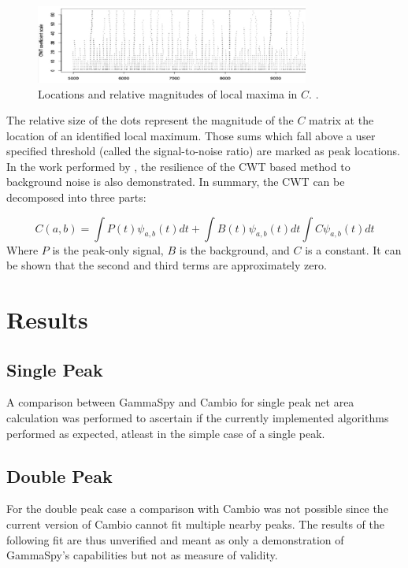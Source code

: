 \documentclass[10pt]{article}
\begin{document}
\begin{figure}[!htbp]
\centering
\includegraphics[width=9cm]{images/cwt_dots.png}
\caption{Locations and relative magnitudes of local maxima in $C$. \cite{Du:2006}.}
\label{cwt_dots}
\end{figure}
The relative size of the dots represent the magnitude of the $C$ matrix at the location of an identified local maximum.
Those sums which fall above a user specified threshold (called the signal-to-noise ratio) are marked as peak locations. \\

In the work performed by \cite{Du:2006}, the resilience of the CWT based method to background noise is also demonstrated.
In summary, the CWT can be decomposed into three parts:

\begin{equation}
    C(a,b) = \int P(t)\psi_{a,b}(t) dt + \int B(t) \psi_{a,b}(t) dt \int C \psi_{a,b} (t)dt
\end{equation}
Where $P$ is the peak-only signal, $B$ is the background, and $C$ is a constant.  It can be shown
that the second and third terms are approximately zero.


\section{Results}


\subsection{Single Peak}
A comparison between GammaSpy and Cambio for single peak net area calculation was performed
to ascertain if the currently implemented algorithms performed as expected, atleast in
the simple case of a single peak.

\subsection{Double Peak}
For the double peak case a comparison with Cambio was not possible since the current
version of Cambio cannot fit multiple nearby peaks.  The results of the following fit
are thus unverified and meant as only a demonstration of GammaSpy's capabilities but
not as measure of validity.
\end{document}
